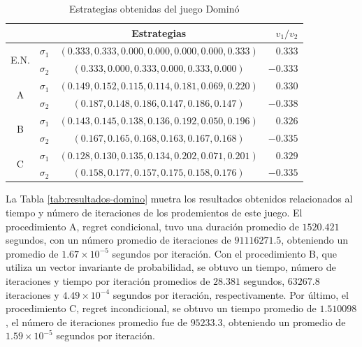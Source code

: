 \begin{table}[ht]
    \centering
    \begin{tabular}{c c|c|r}
        & & Estrategias & $v_1 / v_2$\\
        \hline
        \multirow{2}{*}{E.N.}
        & $\sigma_1$ & $(0.333, 0.333, 0.000, 0.000, 0.000, 0.000, 0.333)$ & $0.333$ \\
        & $\sigma_2$ & $(0.333, 0.000, 0.333, 0.000, 0.333, 0.000)$ &  $-0.333$\\
        \hline
        \multirow{2}{*}{A}
        & $\sigma_1$ & $(0.149, 0.152, 0.115, 0.114, 0.181, 0.069, 0.220)$ & $0.330$ \\
        & $\sigma_2$ & $(0.187, 0.148, 0.186, 0.147, 0.186, 0.147)$ & $-0.338$\\
        \hline
        \multirow{2}{*}{B}
        & $\sigma_1$ & $(0.143, 0.145, 0.138, 0.136, 0.192, 0.050, 0.196)$ & $0.326$ \\
        & $\sigma_2$ & $(0.167, 0.165, 0.168, 0.163, 0.167, 0.168)$ & $-0.335$\\
        \hline
        \multirow{2}{*}{C}
        & $\sigma_1$ & $(0.128, 0.130, 0.135, 0.134, 0.202, 0.071, 0.201)$ & $0.329$ \\
        & $\sigma_2$ & $(0.158, 0.177, 0.157, 0.175, 0.158, 0.176)$ & $-0.335$\\
        \hline
    \end{tabular}
    \caption{Estrategias obtenidas del juego Dominó}
    \label{tab:estrategias-domino}
\end{table}

La Tabla \ref{tab:resultados-domino} muetra los resultados obtenidos relacionados al tiempo y número de iteraciones de los prodemientos de este juego. El procedimiento A, regret condicional, tuvo una duración promedio de $1520.421$ segundos, con un número promedio de iteraciones de $91116271.5$, obteniendo un promedio de $1.67 {\times} 10^{-5}$ segundos por iteración. Con el procedimiento B, que utiliza un vector invariante de probabilidad, se obtuvo un tiempo, número de iteraciones y tiempo por iteración promedios de $28.381$ segundos, $63267.8$ iteraciones y $4.49 {\times} 10^{-4}$ segundos por iteración, respectivamente. Por último, el procedimiento C, regret incondicional, se obtuvo un tiempo promedio de $1.510098$, el número de iteraciones promedio fue de $95233.3$, obteniendo un promedio de $1.59 {\times} 10^{-5}$ segundos por iteración. 

